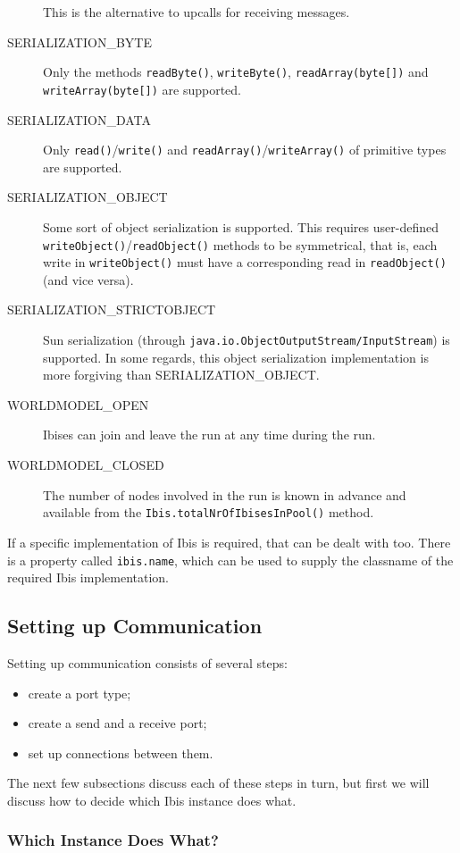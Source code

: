 \documentclass[10pt]{article}
\newcommand{\mysubsubsection}[1]{\subsubsection{#1}\label{#1}}
\begin{document}
\begin{description}
This is the alternative to upcalls for receiving messages.
\item[SERIALIZATION\_BYTE]
Only the methods \texttt{readByte()}, \texttt{writeByte()}, \texttt{readArray(byte[])} and \texttt{writeArray(byte[])} are supported.
\item[SERIALIZATION\_DATA]
Only \texttt{read()}/\texttt{write()} and \texttt{readArray()}/\texttt{writeArray()} of primitive types are supported.
\item[SERIALIZATION\_OBJECT]
Some sort of object serialization is supported.
This requires user-defined
\texttt{writeObject()}/\texttt{readObject()} methods to be symmetrical, that is,
each write in \texttt{writeObject()} must have a corresponding read
in \texttt{readObject()} (and vice versa).
\item[SERIALIZATION\_STRICTOBJECT]
Sun serialization (through \texttt{java.io.ObjectOutputStream/InputStream}) is
supported. In some regards, this object serialization implementation is more
forgiving than SERIALIZATION\_OBJECT.
\item[WORLDMODEL\_OPEN]
Ibises can join and leave the run at any time during the run.
\item[WORLDMODEL\_CLOSED]
The number of nodes involved in the run is known in advance and
available from the \texttt{Ibis.totalNrOfIbisesInPool()} method.
\end{description}

\noindent
If a specific implementation of Ibis is required, that can be dealt with too.
There is a property called \texttt{ibis.name}, which can be used to supply the
classname of the required Ibis implementation.

\subsection{Setting up Communication}

Setting up communication consists of several steps:
\begin{itemize}
\item
create a port type;
\item
create a send and a receive port;
\item
set up connections between them.
\end{itemize}

\noindent
The next few subsections discuss each of these steps in turn, but
first we will discuss how to decide which Ibis instance does what.

\mysubsubsection{Which Instance Does What?}
\end{document}
